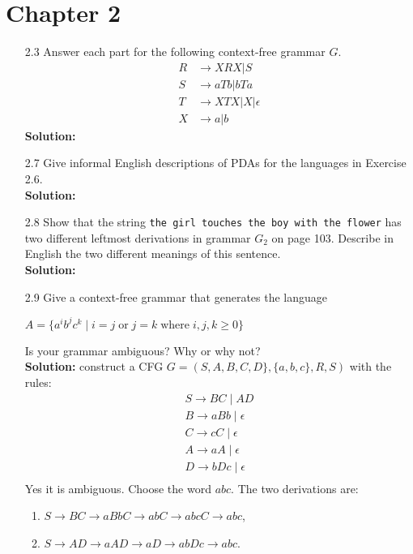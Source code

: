 \section{Chapter 2}

\begin{enumerate}
\item[2.3]Answer each part for the following context-free grammar $G$.
\begin{align*}
R &\rightarrow XRX | S \\
S &\rightarrow aTb | bTa \\
T &\rightarrow XTX | X | \epsilon \\
X &\rightarrow a | b
\end{align*}
\textbf{Solution:} \alreadyanswered

\item[2.7]Give informal English descriptions of PDAs for the languages in Exercise 2.6.
\\
\textbf{Solution:} \alreadyanswered

\item[2.8]Show that the string \verb|the girl touches the boy with the flower| has two different leftmost derivations in grammar $G_2$ on page 103. Describe in English the two different meanings of this sentence.
\\
\textbf{Solution:} \alreadyanswered

\item[2.9]Give a context-free grammar that generates the language
\begin{center}
$A = \{a^ib^jc^k\;\vert\;i=j\;\text{or}\;j=k\;\text{where}\;i,j,k\ge 0\}$
\end{center}
Is your grammar ambiguous? Why or why not?
\\
\textbf{Solution:} construct a CFG $G = (S, A, B, C, D\}, \{a, b, c\}, R, S)$ with the rules:
\begin{align*}
S \rightarrow BC\;\vert\;AD\\
B \rightarrow aBb\;\vert\;\epsilon \\
C \rightarrow cC\;\vert\;\epsilon \\
A \rightarrow aA\;\vert\;\epsilon \\
D \rightarrow bDc\;\vert\;\epsilon \\
\end{align*}
Yes it is ambiguous. Choose the word $abc$. The two derivations are:
\begin{enumerate}
\item $S \rightarrow BC \rightarrow aBbC \rightarrow abC \rightarrow abcC \rightarrow abc$,
\item $S \rightarrow AD \rightarrow aAD \rightarrow aD \rightarrow abDc \rightarrow abc$.
\end{enumerate}


\end{enumerate}
